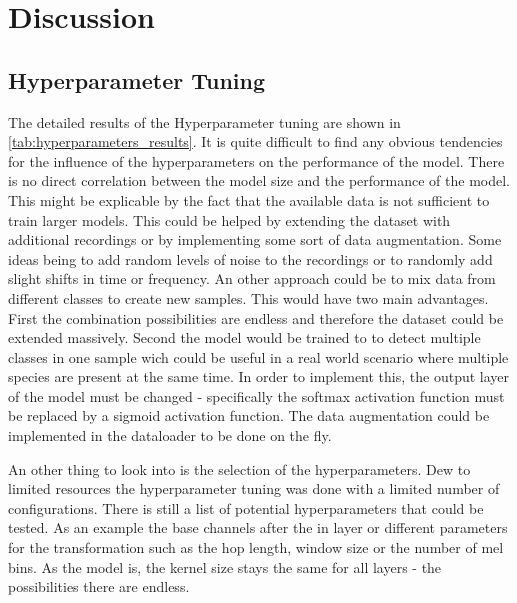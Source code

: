 


\section{Discussion}
\label{discussion}

\subsection{Hyperparameter Tuning}%

The detailed results of the Hyperparameter tuning are shown in \autoref{tab:hyperparameters_results}.
It is quite difficult to find any obvious tendencies for the influence of the
hyperparameters on the performance of the model. There is no direct correlation
between the model size and the performance of the model. This might be explicable
by the fact that the available data is not sufficient to train larger models.
This could be helped by extending the dataset with additional recordings or by
implementing some sort of data augmentation. Some ideas being to add random levels
of noise to the recordings or to randomly add slight shifts in time or frequency.
An other approach could be to mix data from different classes to create new samples.
This would have two main advantages. First the combination possibilities are endless
and therefore the dataset could be extended massively. Second the model would be
trained to to detect multiple classes in one sample wich could be useful in a real
world scenario where multiple species are present at the same time. In order to
implement this, the output layer of the model must be changed - specifically the
softmax activation function must be replaced by a sigmoid activation function.
The data augmentation could be implemented in the dataloader to be done on the fly.

An other thing to look into is the selection of the hyperparameters. Dew to limited
resources the hyperparameter tuning was done with a limited number of configurations.
There is still a list of potential hyperparameters that could be tested. As an example
the base channels after the in layer or different parameters for the transformation
such as the hop length, window size or the number of mel bins. As the model is, the
kernel size stays the same for all layers - the possibilities there are endless.

